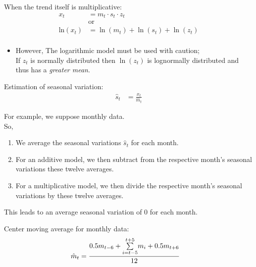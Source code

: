 \documentclass[10pt, french]{article}
\begin{document}
\begin{multicols*}{2}
\begin{definitionNOHFILLsub}
\tcbline

When the trend itself is multiplicative:
\begin{align*}
	x_{t}
	&=	m_{t} \cdot s_{t} \cdot z_{t}	\\
	&\text{or}	\\
	\textrm{ln}(x_{t})
	&=	\ln(m_{t}) + \ln(s_{t}) + \ln(z_{t})	\\
\end{align*}
\begin{itemize}
	\item	However, The logarithmic model must be used with caution;\\	
			If $z_{t}$ is normally distributed then $\ln(z_{t})$ is lognormally distributed and thus has a \textit{greater mean}.
\end{itemize}

\tcbline

Estimation of seasonal variation:\\
\begin{align*}
	\hat{s}_{t}
	&=	\frac{x_{t}}{\hat{m}_{t}}
\end{align*}
\end{definitionNOHFILLsub}

\begin{rappel_enhanced}
For example, we suppose monthly data.	\\
So, 
\begin{enumerate}
	\item	We average the seasonal variations $\hat{s}_{t}$ for each month. 
	\item	For an additive model, we then subtract from the respective month's seasonal variations these twelve averages.
	\item	For a multiplicative model, we then divide the respective month's seasonal variations by these twelve averages.
\end{enumerate}
This leads to an average seasonal variation of 0 for each month.
\end{rappel_enhanced}


Center moving average for monthly data:
\begin{align*}
	\hat{m}_{t}
	&=	\frac{0.5 m_{t - 6} + \overset{t + 5}{\underset{i = t - 5}{\sum}} m_{i} + 0.5m_{t + 6}}{12}
\end{align*}
\end{multicols*}
\end{document}
